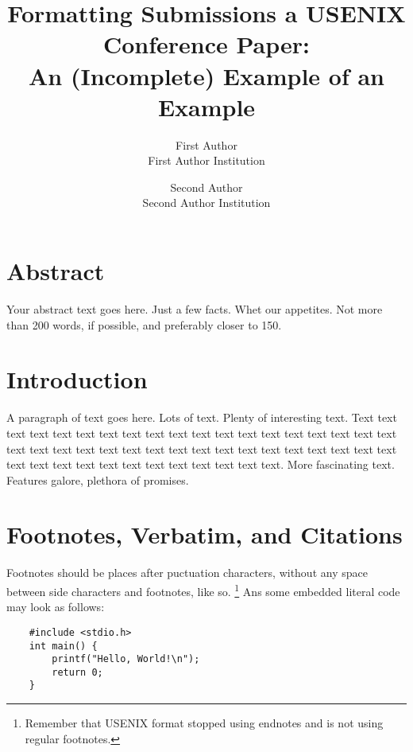 \documentclass[letterpaper,twocolumn]{article}
\begin{document}
\title{
    Formatting Submissions a USENIX Conference Paper:\\
    An (Incomplete) Example of an Example}
\date{}
\author{
    First Author\\
    First Author Institution\\
    \and
    Second Author\\
    Second Author Institution\\}
\maketitle

\section*{\centering Abstract}
\vspace{-0.1in}
Your abstract text goes here. Just a few facts. Whet our appetites.
Not more than 200 words, if possible, and preferably closer to 150.

\section{Introduction}
A paragraph of text goes here. Lots of text. Plenty of interesting
text. Text text text text text text text text text text text text text
text text text text text text text text text text text text text text
text text text text text text text text text text text text text text
text text text text text text text.
More fascinating text. Features galore, plethora of promises.

\section{Footnotes, Verbatim, and Citations}
Footnotes should be places after puctuation characters, without any space 
between side characters and footnotes, like so.
\footnote{
    Remember that USENIX format stopped using endnotes and is not using regular
    footnotes.}
Ans some embedded literal code may look as follows:
\begin{verbatim}
    #include <stdio.h>
    int main() {
        printf("Hello, World!\n");
        return 0;
    }
\end{verbatim}
\end{document}
